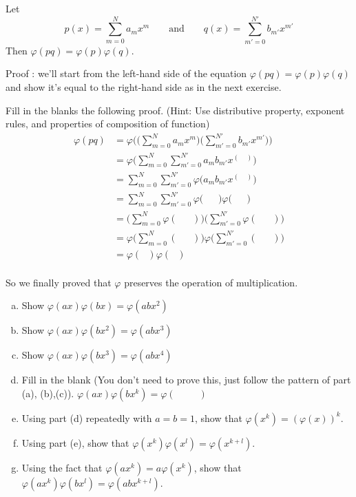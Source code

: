 \begin{prop}{}
	Let  \[p(x) = \sum^ {N}_{m=0} a_{m}x^{m}\qquad \text {and}  \qquad q(x) = \sum^ {N'}_{m'=0} b_{m'}x^{m'}\]
	Then $\varphi(pq) = \varphi(p) \varphi(q)$.
	
	Proof : we'll start from the left-hand side of the equation $\varphi(pq) = \varphi(p) \varphi(q)$ and show it's equal to the right-hand side as in the next exercise.
\end{prop}
\begin{exercise}{}
	Fill in the blanks the following proof. (Hint: Use distributive property, exponent rules, and properties of composition of function)
\begin{align*}
\varphi(pq) &= \varphi\Bigg(\Big(\sum^ {N}_{m=0} a_{m}x^{m}\Big)\Big( \sum^{N'}_{m'=0} b_{m'}x^{m'}\Big)\Bigg)\\
&= \varphi\Bigg(\sum^ {N}_{m=0}\sum^{N'}_{m'=0} a_{m}b_{m'} x^{(~~~~~)} \Bigg)\\
&= \sum^ {N}_{m=0}\sum^{N'}_{m'=0}\varphi\big( a_{m}b_{m'} x^{(~~~~~)} \big)\\
&= \sum^ {N}_{m=0}\sum^{N'}_{m'=0}\varphi\big( ~~~~~~~ \big)\varphi\big(~~~~~~~\big)\\
&= \Big(\sum^ {N}_{m=0}\varphi(~~~~~~~)\Big)\Big( \sum^{N'}_{m'=0}\varphi(~~~~~~~)\Big)\\
&= \varphi \Big(\sum^ {N}_{m=0}(~~~~~~~)\Big)\varphi\Big( \sum^{N'}_{m'=0}(~~~~~~~)\Big)\\
&= \varphi(~~~) \varphi(~~~)\\
\end{align*}
\end{exercise}

So we finally proved that $\varphi$ preserves the operation of multiplication.

\begin{exercise}{}
\begin{enumerate}[(a)]
\item
Show $\varphi(ax) \varphi(bx) = \varphi(abx^2)$
\item
Show $\varphi(ax) \varphi(bx^2) = \varphi(abx^3)$
\item
Show $\varphi(ax) \varphi(bx^3) = \varphi(abx^4)$
\item
Fill in the blank (You don't need to prove this, just follow the pattern of part (a), (b),(c)).
$\varphi(ax) \varphi(bx^k) = \varphi(  ~~~~~~~~~~~         )$
\item
Using part (d) repeatedly with $a = b = 1$, show that $\varphi(x^k) = (\varphi(x))^k$.
\item
Using part (e), show that $\varphi(x^k) \varphi(x^l) = \varphi(x^{k + l})$.
\item
Using the fact that $\varphi(ax^k) = a\varphi(x^k)$, show that $\varphi(ax^k) \varphi(bx^l) = \varphi(abx^{k + l})$.
\end{enumerate}
\end{exercise}

